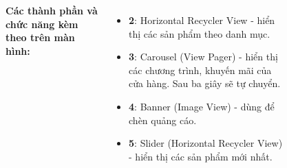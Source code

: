 \documentclass{beamer}
\begin{document}
\begin{frame}
\begin{columns}
\begin{figure}
        \end{figure}
        \indent \textbf{Các thành phần và chức năng kèm theo trên màn hình:}
        \begin{itemize}
            \item \textbf{2}: Horizontal Recycler View - hiển thị các sản phẩm theo danh mục.
            \item \textbf{3}: Carousel (View Pager) - hiển thị các chương trình, khuyến mãi của cửa hàng. Sau ba giây sẽ tự chuyển.
            \item \textbf{4}: Banner (Image View) - dùng để chèn quảng cáo.
            \item \textbf{5}: Slider (Horizontal Recycler View) - hiển thị các sản phẩm mới nhất.
        \end{itemize}
    \end{columns}
\end{frame}
\end{document}
